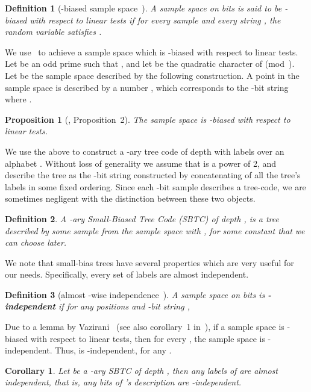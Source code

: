 \documentclass[ letterpaper, 11pt]{article}
\newtheorem{definition}{Definition}
\newtheorem{proposition}[theorem]{Proposition}
\newtheorem{corollary}[theorem]{Corollary}
\newcommand{\KTC}{\textsf{SBTC}\xspace}
\begin{document}
\begin{definition}[-biased sample space~\cite{NN90, AGHP92}]
A sample space  on  bits is said to be -biased with respect to linear tests
if for every sample  and every string , the random variable  satisfies
.
\end{definition}
We use~\cite[Construction 2]{AGHP92} to achieve a sample space 
which is -biased with respect to linear tests.
Let  be an odd prime such that ,
and let  be the quadratic character of { (mod~)}.
Let  be the sample space described by the following construction.
A point in the sample space is described by a number ,
which corresponds to the -bit string 
where .
\begin{proposition}[\cite{AGHP92}, Proposition~2]
The sample space  is -biased with respect to linear tests.
\end{proposition}
We use the above to construct
a -ary tree code of depth  with labels over an alphabet .
Without loss of generality we assume that  is a power of 2, and
describe the tree as the -bit string constructed by concatenating of all
the tree's labels in some fixed ordering.
Since each -bit sample describes a tree-code,
we are sometimes negligent with the distinction between these two objects.

\begin{definition}\label{def:SBTC}
A -ary \emph{Small-Biased Tree Code} (\KTC) of depth , is a tree described by some sample
from the sample space  with ,  for some constant  that we can choose later.
\end{definition}


We note that small-bias trees have several properties which are very useful for our needs.
Specifically, every set of labels are almost independent.
\begin{definition}[almost -wise independence~\cite{AGHP92}]\label{def:independent}
A sample space on  bits is \textbf{-independent} if for any
 positions  and -bit string ,

\end{definition}
Due to a lemma by Vazirani~\cite{Vazirani86} (see also corollary~1 in~\cite{AGHP92}),
if a sample space is -biased with respect to linear tests, then for every , the sample space is -independent. Thus,  is -independent, for any .
\begin{corollary}\label{cor:k-independence}
Let  be a -ary \KTC of depth , then any  labels of  are almost independent,
that is, any  bits of 's description
are -independent.
\end{corollary}
\end{document}
